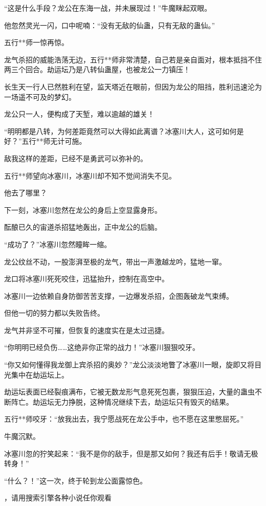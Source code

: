 \begin{this_body}
“这是什么手段？龙公在东海一战，并未展现过！”牛魔眯起双眼。

他忽然灵光一闪，口中呢喃：“没有无敌的仙蛊，只有无敌的蛊仙。”

五行**师一惊再惊。

龙气杀招的威能浩荡无边，五行**师非常清楚，自己若是亲自面对，根本抵挡不住两三个回合。劫运坛乃是八转仙蛊屋，也被龙公一力镇压！

长生天一行人已然胜利在望，监天塔近在眼前，但因为龙公的阻挡，胜利迅速沦为一场遥不可及的梦幻。

龙公只一人，便构成了天堑，难以逾越的雄关！

“明明都是八转，为何差距竟然可以大得如此离谱？冰塞川大人，这可如何是好？”五行**师无计可施。

敌我这样的差距，已经不是勇武可以弥补的。

五行**师望向冰塞川，冰塞川却不知不觉间消失不见。

他去了哪里？

下一刻，冰塞川忽然在龙公的身后上空显露身形。

酝酿已久的宙道杀招猛地轰出，正中龙公的后脑。

“成功了？”冰塞川忽然瞳眸一缩。

龙公纹丝不动，一股澎湃至极的龙气，带出一声激越龙吟，猛地一窜。

龙口将冰塞川死死咬住，迅猛抬升，控制在高空中。

冰塞川一边依赖自身防御苦苦支撑，一边爆发杀招，企图轰破龙气束缚。

但他一切的努力都以失败告终。

龙气并非坚不可摧，但恢复的速度实在是太过迅捷。

“你明明已经负伤……这绝非你正常的战力！”冰塞川狠狠咬牙。

“你又如何懂得我龙御上宾杀招的奥妙？”龙公淡淡地瞥了冰塞川一眼，旋即又将目光集中在劫运坛上。

劫运坛表面已经裂痕满布，它被无数龙形气息死死包裹，狠狠压迫，大量的蛊虫不断阵亡。劫运坛无力挣脱，这种情况继续下去，劫运坛只有毁灭的结果。

五行**师咬牙：“放我出去，我宁愿战死在龙公手中，也不愿在这里憋屈死。”

牛魔沉默。

冰塞川忽的狞笑起来：“我不是你的敌手，但是那又如何？我还有后手！敬请无极转身！”

“什么？！”这一次，终于轮到龙公面露惊色。

，请用搜索引擎各种小说任你观看

\end{this_body}

